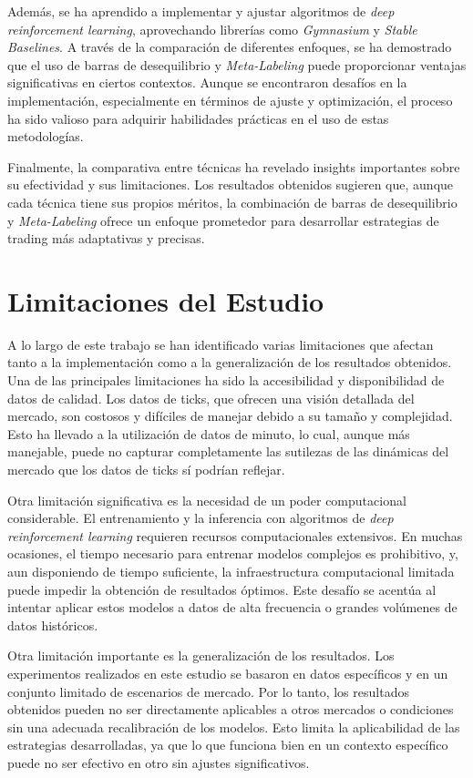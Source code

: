 \documentclass[a4paper,12pt, twoside]{report}
\begin{document}
Además, se ha aprendido a implementar y ajustar algoritmos de \textit{deep reinforcement learning}, 
aprovechando librerías como \textit{Gymnasium} y \textit{Stable Baselines}. A través de la 
comparación de diferentes enfoques, se ha demostrado que el uso de barras de desequilibrio 
y \textit{Meta-Labeling} puede proporcionar ventajas significativas en ciertos contextos. 
Aunque se encontraron desafíos en la implementación, especialmente en términos de ajuste 
y optimización, el proceso ha sido valioso para adquirir habilidades prácticas en el 
uso de estas metodologías.

Finalmente, la comparativa entre técnicas ha revelado insights importantes sobre su 
efectividad y sus limitaciones. Los resultados obtenidos sugieren que, aunque cada 
técnica tiene sus propios méritos, la combinación de barras de desequilibrio y 
\textit{Meta-Labeling} ofrece un enfoque prometedor para desarrollar estrategias de 
trading más adaptativas y precisas.


\section{Limitaciones del Estudio}

A lo largo de este trabajo se han identificado varias limitaciones que afectan tanto a 
la implementación como a la generalización de los resultados obtenidos. Una de las 
principales limitaciones ha sido la accesibilidad y disponibilidad de datos de calidad. 
Los datos de ticks, que ofrecen una visión detallada del mercado, son costosos y difíciles 
de manejar debido a su tamaño y complejidad. Esto ha llevado a la utilización de datos de
 minuto, lo cual, aunque más manejable, puede no capturar completamente las sutilezas de 
 las dinámicas del mercado que los datos de ticks sí podrían reflejar.

Otra limitación significativa es la necesidad de un poder computacional considerable. El 
entrenamiento y la inferencia con algoritmos de \textit{deep reinforcement learning} 
requieren recursos computacionales extensivos. En muchas ocasiones, el tiempo necesario 
para entrenar modelos complejos es prohibitivo, y, aun disponiendo de tiempo suficiente, 
la infraestructura computacional limitada puede impedir la obtención de resultados óptimos. 
Este desafío se acentúa al intentar aplicar estos modelos a datos de alta frecuencia o 
grandes volúmenes de datos históricos.

Otra limitación importante es la generalización de los resultados. Los experimentos 
realizados en este estudio se basaron en datos específicos y en un conjunto limitado de 
escenarios de mercado. Por lo tanto, los resultados obtenidos pueden no ser directamente 
aplicables a otros mercados o condiciones sin una adecuada recalibración de los modelos. 
Esto limita la aplicabilidad de las estrategias desarrolladas, ya que lo que funciona bien 
en un contexto específico puede no ser efectivo en otro sin ajustes significativos.
\end{document}
